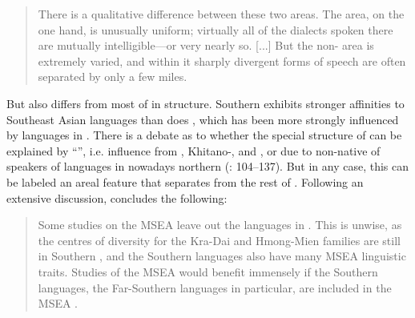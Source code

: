 \begin{quote}
There is a qualitative difference between these two areas. The  area, on the one hand, is unusually uniform; virtually all of the dialects spoken there are mutually intelligible---or very nearly so. [...] But the non- area is extremely varied, and within it sharply divergent forms of speech are often separated by only a few miles. \citep[21]{Ramsey1987}
\end{quote}

\noindent But  also differs from most of  in structure. Southern  exhibits stronger affinities to Southeast Asian languages than does , which has been more strongly influenced by languages in . There is a debate as to whether the special structure of  can be explained by “”, i.e. influence from , Khitano-, and  \citep{Hashimoto1986}, or  due to non-native  of speakers of languages in nowadays northern  (\citealt{McWhorter2007}: 104–137). But in any case, this can be labeled an areal feature that separates  from the rest of . Following an extensive discussion, \citet[429]{deSousa2015} concludes the following:

\begin{quote}
Some studies on the MSEA  leave out the languages in . This is unwise, as the centres of diversity for the Kra-Dai and Hmong-Mien families are still in Southern , and the Southern  languages also have many MSEA linguistic traits. Studies of the MSEA  would benefit immensely if the Southern  languages, the Far-Southern  languages in particular, are included in the MSEA .
\end{quote}

